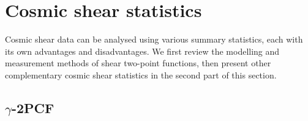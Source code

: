 \section{Cosmic shear statistics}
\label{sec:theory}

Cosmic shear data can be analysed using various summary statistics, each with its own advantages and disadvantages.
We first review the modelling and measurement methods of shear two-point functions, then present other complementary cosmic shear statistics in the second part of this section.

\subsection{$\gamma$-2PCF}
\label{subsec:wl-th}



